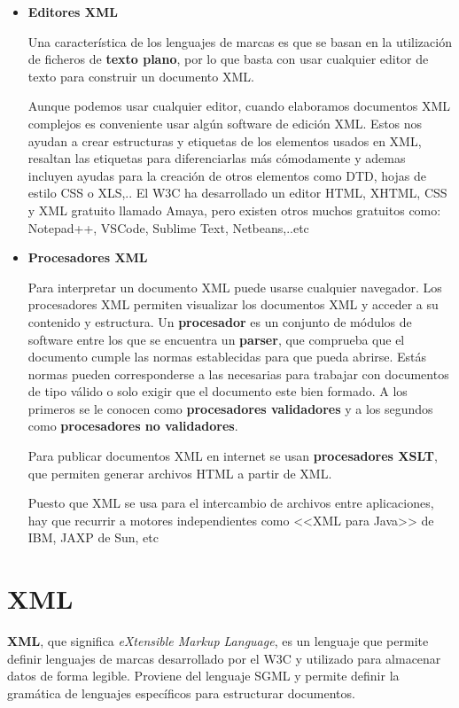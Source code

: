 \begin{itemize}
    \item \textbf{Editores XML}

    Una característica de los lenguajes de marcas es que se basan en la utilización de ficheros de \textbf{\gls{texto plano}}, por lo que basta con usar cualquier editor de texto para construir un documento XML.

    Aunque podemos usar cualquier editor, cuando elaboramos documentos XML complejos es conveniente usar
    algún software de edición XML. Estos nos ayudan a crear estructuras y etiquetas de los elementos usados en XML, resaltan las etiquetas para diferenciarlas más cómodamente y ademas incluyen ayudas para la creación de otros elementos como DTD, hojas de estilo CSS o XLS,.. El W3C ha desarrollado un editor HTML, XHTML, CSS y XML gratuito llamado Amaya, pero existen otros muchos gratuitos como: Notepad++, VSCode, Sublime Text, Netbeans,..etc

    \item \textbf{Procesadores XML}

    Para interpretar un documento XML puede usarse cualquier navegador. Los procesadores XML permiten visualizar los documentos XML y acceder a su contenido y estructura. Un \textbf{procesador} es un conjunto de módulos de software entre los que se encuentra un \textbf{parser}, que comprueba que el documento cumple las normas establecidas para que pueda abrirse. Estás normas pueden corresponderse a las necesarias para trabajar con documentos de tipo válido o solo exigir que el documento este bien formado. A los primeros se le conocen como \textbf{procesadores validadores} y a los segundos como \textbf{procesadores no validadores}.

    Para publicar documentos XML en internet se usan \textbf{procesadores XSLT}, que permiten generar archivos HTML a partir de XML.

    Puesto que XML se usa para el intercambio de archivos entre aplicaciones, hay que recurrir a motores independientes como <<XML para Java>> de IBM, JAXP de Sun, etc
\end{itemize}

\section{XML}
\textbf{XML}, que significa \textit{eXtensible Markup Language}, es un lenguaje que permite definir lenguajes de marcas desarrollado por el W3C y utilizado para almacenar datos de forma legible. Proviene del lenguaje SGML y permite definir la gramática de lenguajes específicos para estructurar documentos. \cite{xml}

